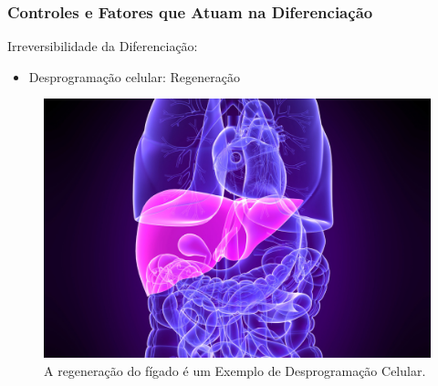 \documentclass[brazil]{beamer}
\begin{document}
\begin{frame}
  \frametitle{Controles e Fatores que Atuam na Diferenciação}
  \raggedright
   \begin{block}{Irreversibilidade da Diferenciação:}
    \footnotesize 
	\begin{itemize}
	  \item Desprogramação celular: Regeneração
	\end{itemize}
    \end{block}

    \begin{figure}
      \includegraphics[scale=0.5]{regenera_figado.jpg}
      \caption{\tiny A regeneração do fígado é um Exemplo de Desprogramação Celular.}
    \end{figure}
\end{frame}
\end{document}
